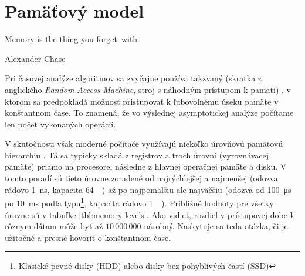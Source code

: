 \chapter{Pamäťový model}
\epigraph{Memory is the thing you forget~with.}{Alexander Chase}

Pri časovej analýze algoritmov sa zvyčajne používa takzvaný \RAM (skratka z anglického \emph{Random-Access Machine}, stroj s náhodným prístupom k pamäti) \citep{aho1974design}, v ktorom sa predpokladá možnosť pristupovať k ľubovoľnému úseku pamäte v konštantnom čase. To znamená, že vo výslednej asymptotickej analýze počítame len počet vykonaných operácií.

V skutočnosti však moderné počítače využívajú niekoľko úrovňovú pamäťovú hierarchiu \citep{drepper2007every}. Tá sa typicky skladá z registrov a troch úrovní \cache (vyrovnávacej pamäte) priamo na procesore, následne z hlavnej operačnej pamäte a disku. V tomto poradí sú tieto úrovne zoradené od najrýchlejšej a najmenšej (odozva rádovo \SI{1}{\nano\second}, kapacita \SI{64}{\kibi\byte}) až po najpomalšiu ale najväčšiu (odozva od \SI{100}{\micro\second} po \SI{10}{\milli\second} podľa typu\footnote{Klasické pevné disky (HDD) alebo disky bez pohyblivých častí (SSD)}, kapacita rádovo \SI{1}{\tebi\byte}). Približné hodnoty pre všetky úrovne sú v tabuľke \ref{tbl:memory-levels}. Ako vidieť, rozdiel v prístupovej dobe k rôznym dátam môže byť až $10\,000\,000$-násobný. Naskytuje sa teda otázka, či je užitočné a presné hovoriť o konštantnom čase.

